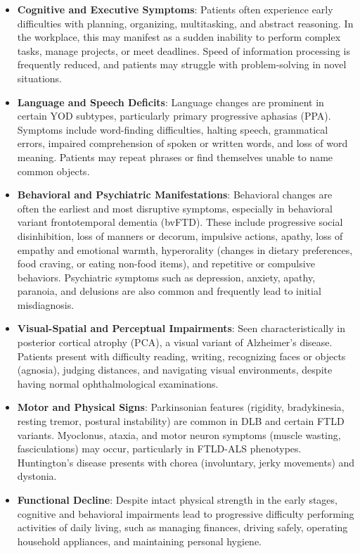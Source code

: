 \begin{itemize}
    \item \textbf{Cognitive and Executive Symptoms}: Patients often experience early difficulties with planning, organizing, multitasking, and abstract reasoning. In the workplace, this may manifest as a sudden inability to perform complex tasks, manage projects, or meet deadlines. Speed of information processing is frequently reduced, and patients may struggle with problem-solving in novel situations.
    \item \textbf{Language and Speech Deficits}: Language changes are prominent in certain YOD subtypes, particularly primary progressive aphasias (PPA). Symptoms include word-finding difficulties, halting speech, grammatical errors, impaired comprehension of spoken or written words, and loss of word meaning. Patients may repeat phrases or find themselves unable to name common objects.
    \item \textbf{Behavioral and Psychiatric Manifestations}: Behavioral changes are often the earliest and most disruptive symptoms, especially in behavioral variant frontotemporal dementia (bvFTD). These include progressive social disinhibition, loss of manners or decorum, impulsive actions, apathy, loss of empathy and emotional warmth, hyperorality (changes in dietary preferences, food craving, or eating non-food items), and repetitive or compulsive behaviors. Psychiatric symptoms such as depression, anxiety, apathy, paranoia, and delusions are also common and frequently lead to initial misdiagnosis.
    \item \textbf{Visual-Spatial and Perceptual Impairments}: Seen characteristically in posterior cortical atrophy (PCA), a visual variant of Alzheimer's disease. Patients present with difficulty reading, writing, recognizing faces or objects (agnosia), judging distances, and navigating visual environments, despite having normal ophthalmological examinations.
    \item \textbf{Motor and Physical Signs}: Parkinsonian features (rigidity, bradykinesia, resting tremor, postural instability) are common in DLB and certain FTLD variants. Myoclonus, ataxia, and motor neuron symptoms (muscle wasting, fasciculations) may occur, particularly in FTLD-ALS phenotypes. Huntington's disease presents with chorea (involuntary, jerky movements) and dystonia.
    \item \textbf{Functional Decline}: Despite intact physical strength in the early stages, cognitive and behavioral impairments lead to progressive difficulty performing activities of daily living, such as managing finances, driving safely, operating household appliances, and maintaining personal hygiene.
\end{itemize}

